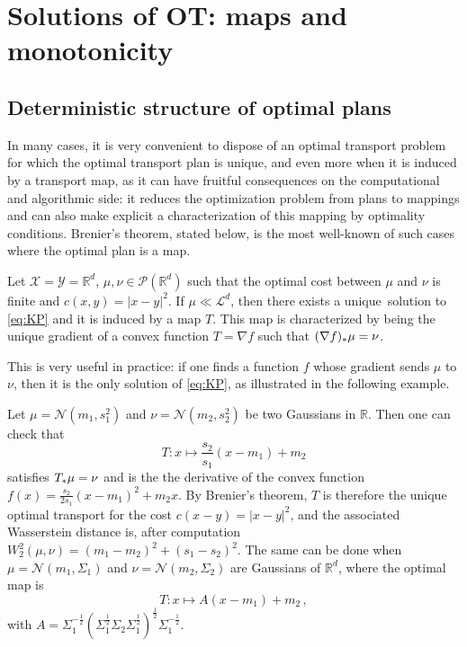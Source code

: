 \section{Solutions of OT: maps and monotonicity}
    \label{sec:optimal-maps}
    \subsection{Deterministic structure of optimal plans}
            \label{sec:deterministic-plans}
        In many cases, it is very convenient to dispose of an optimal transport problem for which the optimal transport plan is unique, and even more when it is induced by a transport map, as it can have fruitful consequences on the computational and algorithmic side: it reduces the optimization problem from plans to mappings and can also make explicit a characterization of this mapping by optimality conditions. Brenier's theorem, stated below, is the most well-known of such cases where the optimal plan is a map.
        \begin{theorem}
            \label{theorem:brenier}
            Let $\mathcal{X}=\mathcal{Y}=\mathbb{R}^d$, $\mu,\nu \in\mathcal{P}(\mathbb{R}^d)$ such that the optimal cost between $\mu$ and $\nu$ is finite and $c(x,y)=|x-y|^{2}$. If $\mu\ll \mathcal{L}^d$, then there exists a unique\footnotemark\ solution to \cref{eq:KP} and it is induced by a map $T$. This map is characterized by being the unique gradient of a convex function $T=\nabla f$ such that $(\nabla f)_*\mu=\nu$.
        \end{theorem}
        This is very useful in practice: if one finds a function $f$ whose gradient sends $\mu$ to $\nu$, then it is the only solution of \cref{eq:KP}, as illustrated in the following example.
        \begin{example}
            Let $\mu=\mathcal{N}(m_1, s_1^2)$ and $\nu=\mathcal{N}(m_2, s_2^2)$ be two Gaussians in $\mathbb{R}$. Then one can check that
            $$T:x\mapsto\frac{s_2}{s_1}(x-m_1)+m_2$$
            satisfies $T_* \mu=\nu$ and is the the derivative of the convex function
            $f(x)=\frac{s_2}{2 s_1}(x-m_1)^2+m_2 x$. By Brenier's theorem, $T$ is therefore the unique optimal transport for the cost $c(x-y)=|x-y|^2$, and the associated Wasserstein distance is, after computation $W_2^2(\mu,\nu)=(m_1-m_2)^2+(s_1-s_2)^2$. The same can be done when $\mu=\mathcal{N}(m_1, \Sigma_1)$ and $\nu=\mathcal{N}(m_2, \Sigma_2)$ are Gaussians of $\mathbb{R}^d$, where the optimal map is
            $$T:x\mapsto A(x-m_1)+m_2\,,$$
            with $A=\Sigma_1^{-\frac12}(\Sigma_1^{\frac12} \Sigma_2 \Sigma_1^{\frac12})^{\frac12} \Sigma_1^{-\frac12}$.
        \end{example}
